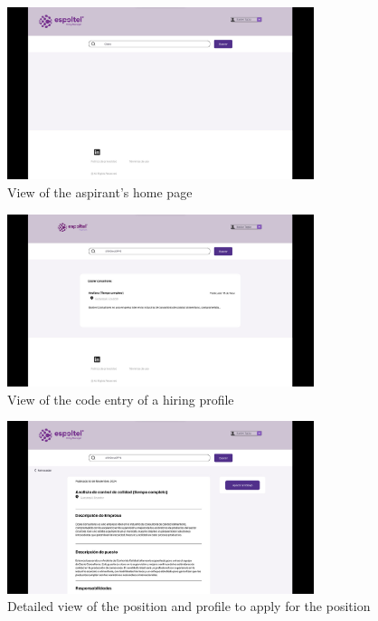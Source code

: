 \documentclass{scrreprt}
\begin{document}
\begin{figure}[H]
	\centering \small
	\includegraphics[width=0.8\textwidth]{WebPrototype/wflow-44.jpeg}
	\caption{View of the aspirant's home page}
\end{figure}

\begin{figure}[H]
	\centering \small
	\includegraphics[width=0.8\textwidth]{WebPrototype/wflow-45.jpeg}
	\caption{View of the code entry of a hiring profile}
\end{figure}

\begin{figure}[H]
	\centering \small
	\includegraphics[width=0.8\textwidth]{WebPrototype/wflow-46.jpeg}
	\caption{Detailed view of the position and profile to apply for the position}
\end{figure}
\end{document}

